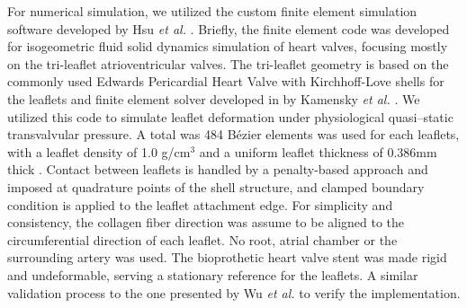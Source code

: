    
    For numerical simulation, we utilized the custom finite element simulation software developed by Hsu \textit{et al.} \cite{hsu_dynamic_2015, kamensky_immersogeometric_2015, kiendl_isogeometric_2015, wu_anisotropic_2018}. Briefly, the finite element code was developed for isogeometric fluid solid dynamics simulation of heart valves, focusing mostly on the tri-leaflet atrioventricular valves. The tri-leaflet geometry is based on the commonly used Edwards Pericardial Heart Valve with Kirchhoff-Love shells for the leaflets \cite{kiendl_isogeometric_2015} and finite element solver developed in by Kamensky \textit{et al.} \cite {kamensky_immersogeometric_2015}. We utilized this code to simulate leaflet deformation under physiological quasi--static transvalvular pressure. 
    A total was 484 B\'ezier elements was used for each leaflets, with a leaflet density of 1.0 g/cm$^3$ and a uniform leaflet thickness of 0.386mm thick \cite{hsu_dynamic_2015}. Contact between leaflets is handled by a penalty-based approach and imposed at quadrature points of the shell structure, and clamped boundary condition is applied to the leaflet attachment edge. 
    For simplicity and consistency, the collagen fiber direction was assume to be aligned to the circumferential direction of each leaflet. No root, atrial chamber or the surrounding artery was used. The bioprothetic heart valve stent was made rigid and undeformable, serving a stationary reference for the leaflets. A similar validation process to the one presented by Wu \textit{et al.} \cite{wu_anisotropic_2018} to verify the implementation.
